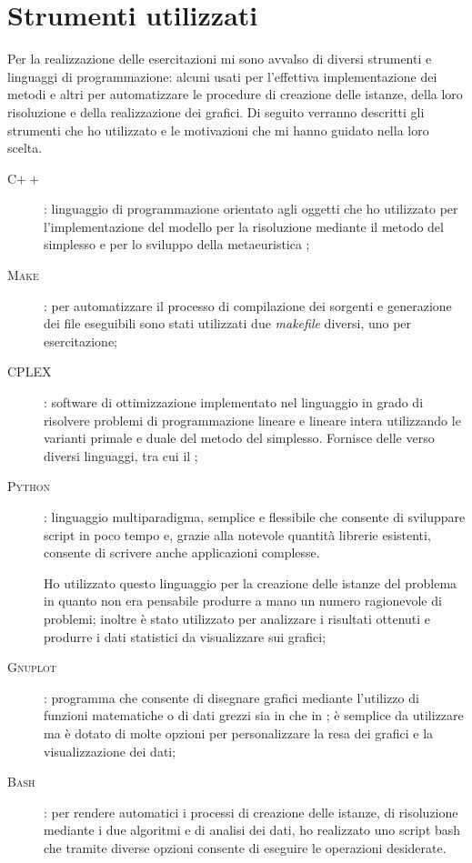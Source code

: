 \section{Strumenti utilizzati}
Per la realizzazione delle esercitazioni mi sono avvalso di diversi strumenti e linguaggi di programmazione: alcuni usati per l'effettiva implementazione dei metodi e altri per automatizzare le procedure di creazione delle istanze, della loro risoluzione e della realizzazione dei grafici.
Di seguito verranno descritti gli strumenti che ho utilizzato e le motivazioni che mi hanno guidato nella loro scelta.

\begin{description}
	\item[\textsc{C$++$}]: linguaggio di programmazione orientato agli oggetti che ho utilizzato per l'implementazione del modello per la risoluzione mediante il metodo del simplesso e per lo sviluppo della metaeuristica \tabu;
	\item[\textsc{Make}]: per automatizzare il processo di compilazione dei sorgenti e generazione dei file eseguibili sono stati utilizzati due \emph{makefile} diversi, uno per esercitazione;
	\item[\textsc{CPLEX}]: software di ottimizzazione implementato nel linguaggio  in grado di risolvere problemi di programmazione lineare e lineare intera utilizzando le varianti primale e duale del metodo del simplesso. Fornisce delle  verso diversi linguaggi, tra cui il ;
	\item[\textsc{Python}]: linguaggio multiparadigma, semplice e flessibile che consente di sviluppare script in poco tempo e, grazie alla notevole quantità librerie esistenti, consente di scrivere anche applicazioni complesse.
	
	Ho utilizzato questo linguaggio per la creazione delle istanze del problema in quanto non era pensabile produrre a mano un numero ragionevole di problemi; inoltre è stato utilizzato per analizzare i risultati ottenuti e produrre i dati statistici da visualizzare sui grafici;
	\item[\textsc{Gnuplot}]: programma che consente di disegnare grafici mediante l'utilizzo di funzioni matematiche o di dati grezzi sia in  che in ; è semplice da utilizzare ma è dotato di molte opzioni per personalizzare la resa dei grafici e la visualizzazione dei dati;
	\item[\textsc{Bash}]: per rendere automatici i processi di creazione delle istanze, di risoluzione mediante i due algoritmi e di analisi dei dati, ho realizzato uno script bash che tramite diverse opzioni consente di eseguire le operazioni desiderate.
\end{description}

